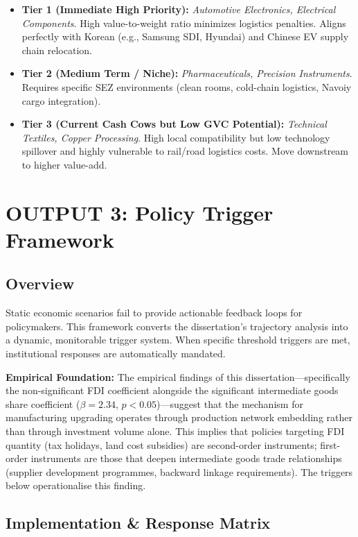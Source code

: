 \documentclass[11pt,a4paper]{article}
\begin{document}
\begin{itemize}
    \item \textbf{Tier 1 (Immediate High Priority):} \textit{Automotive Electronics, Electrical Components}. High value-to-weight ratio minimizes logistics penalties. Aligns perfectly with Korean (e.g., Samsung SDI, Hyundai) and Chinese EV supply chain relocation.
    \item \textbf{Tier 2 (Medium Term / Niche):} \textit{Pharmaceuticals, Precision Instruments}. Requires specific SEZ environments (clean rooms, cold-chain logistics, Navoiy cargo integration).
    \item \textbf{Tier 3 (Current Cash Cows but Low GVC Potential):} \textit{Technical Textiles, Copper Processing}. High local compatibility but low technology spillover and highly vulnerable to rail/road logistics costs. Move downstream to higher value-add.
\end{itemize}

\newpage
\section{OUTPUT 3: Policy Trigger Framework}

\subsection{Overview}
Static economic scenarios fail to provide actionable feedback loops for policymakers. This framework converts the dissertation’s trajectory analysis into a dynamic, monitorable trigger system. When specific threshold triggers are met, institutional responses are automatically mandated.

\textbf{Empirical Foundation:} The empirical findings of this dissertation---specifically the non-significant FDI coefficient alongside the significant intermediate goods share coefficient ($\beta = 2.34$, $p < 0.05$)---suggest that the mechanism for manufacturing upgrading operates through production network embedding rather than through investment volume alone. This implies that policies targeting FDI quantity (tax holidays, land cost subsidies) are second-order instruments; first-order instruments are those that deepen intermediate goods trade relationships (supplier development programmes, backward linkage requirements). The triggers below operationalise this finding.

\subsection{Implementation \& Response Matrix}
\end{document}
